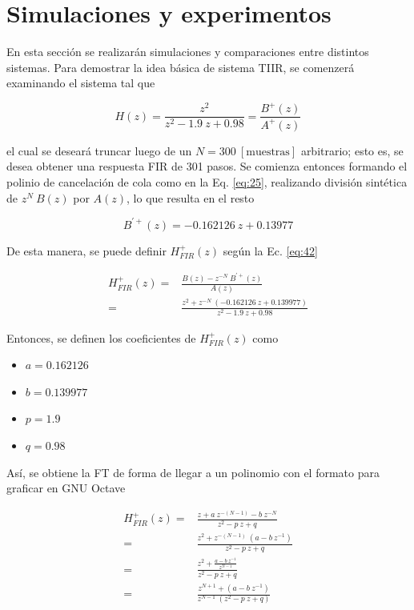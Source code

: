 \section{Simulaciones y experimentos}
    En esta sección se realizarán simulaciones y comparaciones entre distintos sistemas. Para demostrar la idea básica de sistema TIIR, se comenzerá examinando el sistema tal que

    \begin{equation}
      H(z) = \frac{z^{2}}{z^{2} - 1.9 \: z + 0.98} = \frac{B^{+}(z)}{A^{+}(z)}
    \end{equation}

    el cual se deseará truncar luego de un $N = 300 \: [\text{muestras}]$ arbitrario; esto es, se desea obtener una respuesta FIR de 301 pasos. Se comienza entonces formando el polinio de cancelación de cola como en la Eq. \ref{eq:25}, realizando división sintética de $z^{N} \: B(z)$  por $A(z)$, lo que resulta en el resto

    \begin{equation}
      B^{\prime +}(z) = - 0.162126 \: z + 0.13977
    \end{equation}

    De esta manera, se puede definir $H_{FIR}^{+}(z)$ según la Ec. \ref{eq:42}

    \begin{align}
      H_{FIR}^{+}(z) =& \frac{B(z) - z^{-N} \: B^{\prime + }(z)}{A(z)} \nonumber \\
      =& \frac{z^{2} + z^{-N} \: \left( - 0.162126 \: z + 0.139977 \right)}{z^{2} - 1.9 \: z + 0.98}
    \end{align}

    Entonces, se definen los coeficientes de $H_{FIR}^{+}(z)$  como

    \begin{itemize}
      \item $a = 0.162126$
      \item $b = 0.139977$
      \item $p = 1.9$
      \item $q = 0.98$
    \end{itemize}

    Así, se obtiene la FT de forma de llegar a un polinomio con el formato para graficar en GNU Octave

    \begin{align}
      H_{FIR}^{+}(z) =& \frac{z + a \: z^{-(N-1)} - b \: z^{-N}}{z^{2} - p \: z + q} \nonumber \\
      =& \frac{z^{2} + z^{-(N-1)} \: \left(a - b \: z^{-1} \right)}{z^{2} - p \: z + q} \nonumber \\
      =& \frac{z^{2} + \frac{a - b \: z^{-1}}{z^{N-1}}}{z^{2} - p \: z + q} \nonumber \\
      =& \frac{z^{N+1} + \left( a - b \: z^{-1} \right)}{z^{N-1} \: \left( z^{2} - p \: z + q \right)}
    \end{align}

